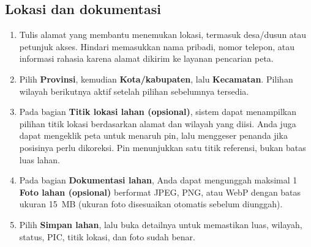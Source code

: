 \subsection{Lokasi dan dokumentasi}

\begin{enumerate}
  \item Tulis alamat yang membantu menemukan lokasi, termasuk desa/dusun atau petunjuk akses. Hindari memasukkan nama pribadi, nomor telepon, atau informasi rahasia karena alamat dikirim ke layanan pencarian peta.
  \item Pilih \textbf{Provinsi}, kemudian \textbf{Kota/kabupaten}, lalu \textbf{Kecamatan}. Pilihan wilayah berikutnya aktif setelah pilihan sebelumnya tersedia.
  \item Pada bagian \textbf{Titik lokasi lahan (opsional)}, sistem dapat menampilkan pilihan titik lokasi berdasarkan alamat dan wilayah yang diisi. Anda juga dapat mengeklik peta untuk menaruh pin, lalu menggeser penanda jika posisinya perlu dikoreksi. Pin menunjukkan satu titik referensi, bukan batas luas lahan.
  \item Pada bagian \textbf{Dokumentasi lahan}, Anda dapat mengunggah maksimal 1 \textbf{Foto lahan (opsional)} berformat JPEG, PNG, atau WebP dengan batas ukuran 15~MB (ukuran foto disesuaikan otomatis sebelum diunggah).
  \item Pilih \textbf{Simpan lahan}, lalu buka detailnya untuk memastikan luas, wilayah, status, PIC, titik lokasi, dan foto sudah benar.
\end{enumerate}
